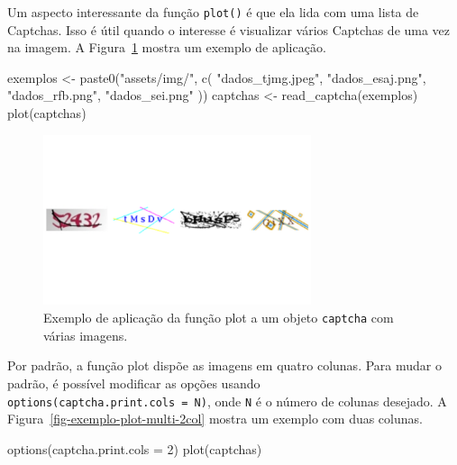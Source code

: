 \documentclass[12pt,twoside,brazilian]{book}
\newenvironment{Shaded}{\begin{snugshade}}{\end{snugshade}}
\newcommand{\AttributeTok}[1]{\textcolor[rgb]{0.40,0.45,0.13}{#1}}
\newcommand{\DecValTok}[1]{\textcolor[rgb]{0.68,0.00,0.00}{#1}}
\newcommand{\FunctionTok}[1]{\textcolor[rgb]{0.28,0.35,0.67}{#1}}
\newcommand{\NormalTok}[1]{\textcolor[rgb]{0.00,0.23,0.31}{#1}}
\newcommand{\OtherTok}[1]{\textcolor[rgb]{0.00,0.23,0.31}{#1}}
\newcommand{\StringTok}[1]{\textcolor[rgb]{0.13,0.47,0.30}{#1}}
\begin{document}
Um aspecto interessante da função \texttt{plot()} é que ela lida com uma
lista de Captchas. Isso é útil quando o interesse é visualizar vários
Captchas de uma vez na imagem. A Figura~\ref{fig-exemplo-plot-multi}
mostra um exemplo de aplicação.

\begin{Shaded}
\begin{Highlighting}[]
\NormalTok{exemplos }\OtherTok{\textless{}{-}} \FunctionTok{paste0}\NormalTok{(}\StringTok{"assets/img/"}\NormalTok{, }\FunctionTok{c}\NormalTok{(}
  \StringTok{"dados\_tjmg.jpeg"}\NormalTok{,}
  \StringTok{"dados\_esaj.png"}\NormalTok{,}
  \StringTok{"dados\_rfb.png"}\NormalTok{,}
  \StringTok{"dados\_sei.png"}
\NormalTok{))}
\NormalTok{captchas }\OtherTok{\textless{}{-}} \FunctionTok{read\_captcha}\NormalTok{(exemplos)}
\FunctionTok{plot}\NormalTok{(captchas)}
\end{Highlighting}
\end{Shaded}

\begin{figure}[H]

{\centering \includegraphics[width=0.7\textwidth,height=\textheight]{./resultados_files/figure-pdf/fig-exemplo-plot-multi-1.pdf}

}

\caption{\label{fig-exemplo-plot-multi}Exemplo de aplicação da função
plot a um objeto \texttt{captcha} com várias imagens.}

\end{figure}

Por padrão, a função plot dispõe as imagens em quatro colunas. Para
mudar o padrão, é possível modificar as opções usando
\texttt{options(captcha.print.cols\ =\ N)}, onde \texttt{N} é o número
de colunas desejado. A Figura~\ref{fig-exemplo-plot-multi-2col} mostra
um exemplo com duas colunas.

\begin{Shaded}
\begin{Highlighting}[]
\FunctionTok{options}\NormalTok{(}\AttributeTok{captcha.print.cols =} \DecValTok{2}\NormalTok{)}
\FunctionTok{plot}\NormalTok{(captchas)}
\end{Highlighting}
\end{Shaded}
\end{document}

